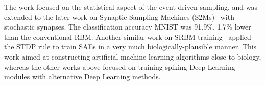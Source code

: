 The work focused on the statistical aspect of the event-driven sampling, and was extended to the later work on Synaptic Sampling Machines (S2Ms)~\citep{neftci2016stochastic} with stochastic synapses.
The classification accuracy \DIFdelbegin {}\DIFdelend \DIFaddbegin {}\DIFaddend MNIST was 91.9\%, 1.7\% lower than the conventional RBM.
Another similar work on SRBM training~\citep{burbank2015mirrored} applied the STDP rule to train SAEs in a very much biologically-plausible manner.
This work aimed at constructing artificial machine learning algorithms close to biology, whereas the other works above focused on training spiking Deep Learning modules with \DIFdelbegin {}\DIFdelend \DIFaddbegin {}\DIFaddend alternative Deep Learning methods.


